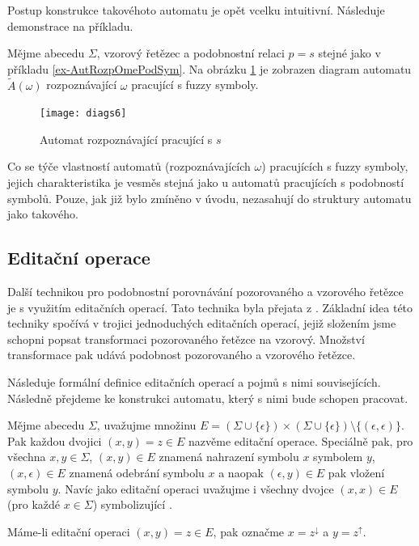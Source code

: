 \documentclass[a4paper,10pt]{article}
\begin{document}
Postup konstrukce takovéhoto automatu je opět vcelku intuitivní. Následuje demonstrace na příkladu.

\begin{example}
 Mějme abecedu $\Sigma$, vzorový řetězec a podobnostní relaci $p = s$ stejné jako v příkladu \ref{ex-AutRozpOmePodSym}. Na obrázku \ref{diag-AutRozpOmePraFuzSym} je zobrazen diagram automatu $\widetilde{A}(\omega)$ rozpoznávající $\omega$ pracující s fuzzy symboly.
 
 \begin{figure}
    \texttt{[image: diags6]}
    \caption{Automat rozpoznávající  pracující s $s$} \label{diag-AutRozpOmePraFuzSym}
  \end{figure}
\end{example}

Co se týče vlastností automatů (rozpoznávajících $\omega$) pracujících s fuzzy symboly, jejich charakteristika je vesměs stejná jako u automatů pracujících s podobností symbolů. Pouze, jak již bylo zmíněno v úvodu, nezasahují do struktury automatu jako takového.

\subsection{Editační operace}
Další technikou pro podobnostní porovnávání pozorovaného a vzorového řetězce je s využitím editačních operací. Tato technika byla přejata z \cite{AstGonMenGar-FuzzAutEpsMovCmpFuzzMeasBtwStrs}. Základní idea této techniky spočívá v trojici jednoduchých editačních operací, jejiž složením jsme schopni popsat transformaci pozorovaného řetězce na vzorový. Množství transformace pak udává podobnost pozorovaného a vzorového řetězce.

Následuje formální definice editačních operací a pojmů s nimi souvisejících. Následně přejdeme ke konstrukci automatu, který s nimi bude schopen pracovat.

\begin{definition}
Mějme abecedu $\Sigma$, uvažujme množinu $E = (\Sigma \cup \{ \epsilon \}) \times (\Sigma \cup \{ \epsilon \}) \setminus \{ (\epsilon, \epsilon) \}$. Pak každou dvojici $(x, y) = z \in E$ nazvěme editační operace. Speciálně pak, pro všechna $x, y \in \Sigma$, $(x, y) \in E$ znamená nahrazení symbolu $x$ symbolem $y$, $(x, \epsilon) \in E$ znamená odebrání symbolu $x$ a naopak $(\epsilon, y) \in E$ pak vložení symbolu $y$. Navíc jako editační operaci uvažujme i všechny dvojce $(x, x) \in E$ (pro každé $x \in \Sigma$) symbolizující .

Máme-li editační operaci $(x, y) = z \in E$, pak označme $x = z^\downarrow$ a $y = z^\uparrow$.
\end{definition}
\end{document}
